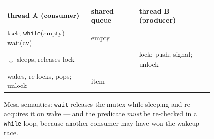 \begin{figure}[htbp]
\centering
\begin{tabular}{lll}
\toprule
thread A (consumer) & shared queue & thread B (producer) \\
\midrule
lock; \texttt{while}(empty) wait(cv) & empty & \\
  $\downarrow$ sleeps, releases lock & & lock; push; signal; unlock\\
wakes, re-locks, pops; unlock & item & \\
\bottomrule
\end{tabular}
\caption{Mesa semantics: \texttt{wait} releases the mutex while
sleeping and re-acquires it on wake --- and the predicate
\emph{must} be re-checked in a \texttt{while} loop, because another
consumer may have won the wakeup race.}
\label{fig:cvstate13}
\end{figure}

